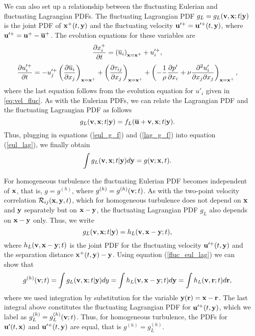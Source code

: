 \documentclass[oneside,a4paper,11pt]{report}
\newcommand{\uavg}{\overline{u}}
\newcommand{\pfluc}{p'}
\newcommand{\ufluc}{u'}
\newcommand{\rs}{\tau}          %
\newcommand{\tpvc}{\mathcal{R}} %
\begin{document}
We can also set up a relationship between the fluctuating Eulerian and fluctuating Lagrangian PDFs. The fluctuating Lagrangian PDF $g_L = g_L(\mathbf{v}, \mathbf{x}; t|\mathbf{y})$ is the joint PDF of $\mathbf{x}^+(t,\mathbf{y})$ and the fluctuating velocity $\mathbf{u}'^+= \mathbf{u}'^+(t,\mathbf{y})$, where $\mathbf{u}'^+ = \mathbf{u}^+- \overline{\mathbf{u}}^+$. The evolution equations for these variables are
\begin{equation}
\frac{\partial x_i^+}{\partial t} = \left ( \uavg_i \right )_{\xvec = \xvec^+} + u'^+_i,
\end{equation}
\begin{equation}
\frac{\partial u'^+_i}{\partial t} = -u'^+_j \left ( \frac{\partial \uavg_i}{\partial x_j} \right )_{\xvec = \xvec^+} + \left ( \frac{\partial \rs_{ij}}{\partial x_j} \right )_{\xvec = \xvec^+} + \left ( - \frac{1}{\rho} \frac{\partial \pfluc}{\partial x_i} + \nu \frac{\partial^2 \ufluc_i}{\partial x_j \partial x_j} \right )_{\xvec = \xvec^+},
\end{equation}
where the last equation follows from the evolution equation for $\ufluc_i$ given in \cref{eq:vel_fluc}. As with the Eulerian PDFs, we can relate the Lagrangian PDF and the fluctuating Lagrangian PDF as follows
\begin{equation}
\label{lag_g_f}
g_L(\mathbf{v},\mathbf{x}; t|\mathbf{y}) = f_L(\overline{\mathbf{u}} + \mathbf{v}, \mathbf{x}; t|\mathbf{y}).
\end{equation}
Thus, plugging in equations (\ref{eul_g_f}) and (\ref{lag_g_f}) into equation (\ref{eul_lag}), we finally obtain
\begin{equation}
\label{fluc_eul_lag}
\int g_L(\mathbf{v},\mathbf{x}; t|\mathbf{y}) d\mathbf{y} = g(\mathbf{v}; \mathbf{x},t).
\end{equation}

For homogeneous turbulence the fluctuating Eulerian PDF becomes independent of $\mathbf{x}$, that is, $g = g^{(h)}$, where $g^{(h)} = g^{(h)}(\mathbf{v};t)$. As with the two-point velocity correlation $\tpvc_{ij}(\xvec,\yvec,t)$, which for homogeneous turbulence does not depend on $\mathbf{x}$ and $\mathbf{y}$ separately but on $\mathbf{x} - \mathbf{y}$, the fluctuating Lagrangian PDF $g_L$  also depends on $\mathbf{x} - \mathbf{y}$ only. Thus, we write
\begin{equation}
g_L(\mathbf{v} ,\mathbf{x} ; t |\mathbf{y}) = h_L(\mathbf{v}, \mathbf{x} - \mathbf{y}; t),
\end{equation}
where $h_L(\mathbf{v}, \mathbf{x} - \mathbf{y}; t)$ is the joint PDF for the fluctuating velocity $\mathbf{u}'^+(t,\mathbf{y})$ and the separation distance $\mathbf{x}^+(t,\mathbf{y}) - \mathbf{y}$. Using equation (\ref{fluc_eul_lag}) we can show that
\begin{equation}
g^{(h)}(\mathbf{v};t) =  \int g_L(\mathbf{v},\mathbf{x};t|\mathbf{y})dy = \int h_L(\mathbf{v}, \mathbf{x} - \mathbf{y}; t) d\mathbf{y} = \int h_L(\mathbf{v}, \mathbf{r};t) d\mathbf{r},
\end{equation}
where we used integration by substitution for the variable $\mathbf{y}(\mathbf{r}) = \mathbf{x} - \mathbf{r}$. The last integral above constitutes the fluctuating Lagrangian PDF for $\mathbf{u}'^+(t,\mathbf{y})$, which we label as $g_L^{(h)} = g_L^{(h)}(\mathbf{v}; t)$. Thus, for homogeneous turbulence, the PDFs for $\mathbf{u}'(t,\mathbf{x})$ and $\mathbf{u}'^+(t,\mathbf{y})$ are equal, that is $g^{(h)} = g_L^{(h)}$.
\end{document}
